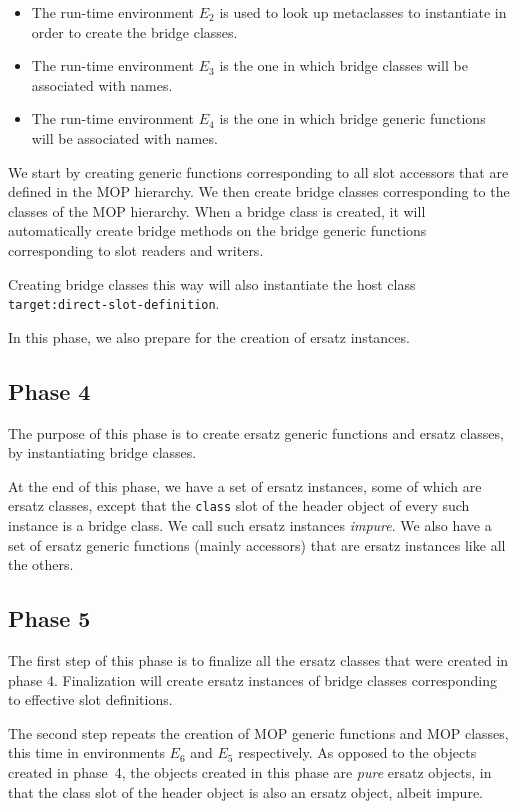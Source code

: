 \begin{itemize}
\item The run-time environment $E_2$ is used to look up metaclasses to
  instantiate in order to create the bridge classes.
\item The run-time environment $E_3$ is the one in which bridge
  classes will be associated with names.
\item The run-time environment $E_4$ is the one in which bridge
  generic functions will be associated with names.
\end{itemize}

We start by creating generic functions corresponding to all slot
accessors that are defined in the MOP hierarchy.  We then create
bridge classes corresponding to the classes of the MOP hierarchy.
When a bridge class is created, it will automatically create bridge
methods on the bridge generic functions corresponding to slot readers
and writers.

Creating bridge classes this way will also instantiate the host class
\texttt{target:direct-slot-definition}.

In this phase, we also prepare for the creation of ersatz instances.

\subsection{Phase 4}

The purpose of this phase is to create ersatz generic functions and
ersatz classes, by instantiating bridge classes. 

At the end of this phase, we have a set of ersatz instances, some of
which are ersatz classes, except that the \texttt{class} slot of the
header object of every such instance is a bridge class.  We call such
ersatz instances \emph{impure}.  We also have a set of ersatz generic
functions (mainly accessors) that are ersatz instances like all the
others.

\subsection{Phase 5}

The first step of this phase is to finalize all the ersatz classes
that were created in phase 4.  Finalization will create ersatz
instances of bridge classes corresponding to effective slot
definitions.

The second step repeats the creation of MOP generic functions and MOP
classes, this time in environments $E_6$ and $E_5$ respectively.  As
opposed to the objects created in phase~4, the objects created in this
phase are \emph{pure} ersatz objects, in that the class slot of the
header object is also an ersatz object, albeit impure.

